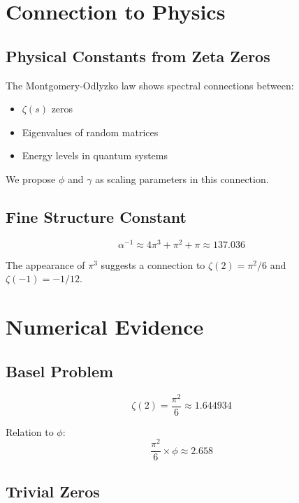 \documentclass[12pt,a4paper]{article}
\begin{document}
\section{Connection to Physics}

\subsection{Physical Constants from Zeta Zeros}

The Montgomery-Odlyzko law shows spectral connections between:
\begin{itemize}
\item $\zeta(s)$ zeros
\item Eigenvalues of random matrices
\item Energy levels in quantum systems
\end{itemize}

We propose $\phi$ and $\gamma$ as scaling parameters in this connection.

\subsection{Fine Structure Constant}

\begin{equation}
\alpha^{-1} \approx 4\pi^3 + \pi^2 + \pi \approx 137.036
\end{equation}

The appearance of $\pi^3$ suggests a connection to $\zeta(2) = \pi^2/6$ and $\zeta(-1) = -1/12$.

\section{Numerical Evidence}

\subsection{Basel Problem}

\begin{equation}
\zeta(2) = \frac{\pi^2}{6} \approx 1.644934
\end{equation}

Relation to $\phi$:
\begin{equation}
\frac{\pi^2}{6} \times \phi \approx 2.658
\end{equation}

\subsection{Trivial Zeros}
\end{document}
